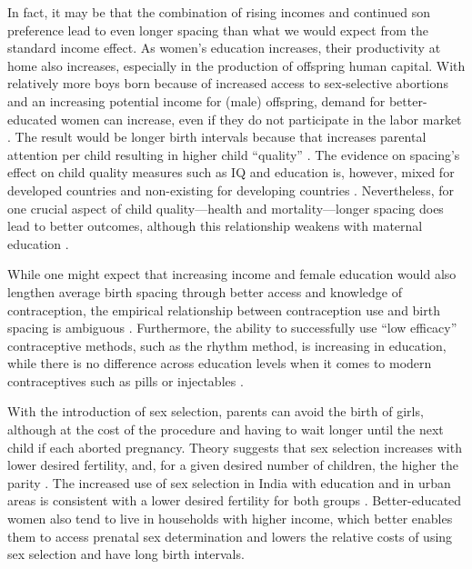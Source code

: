 \documentclass[12pt,letterpaper]{article}
\begin{document}
In fact, it may be that the combination of rising incomes and continued son preference 
lead to even longer spacing than what we would expect from the standard income effect.
As women's education increases, their productivity at home also increases, especially in 
the production of offspring human capital.
With relatively more boys born because of increased access to sex-selective 
abortions and an increasing potential income for (male) offspring, demand for 
better-educated women can increase, even if they do not participate in the labor market 
\citep{Behrman1999}.
The result would be longer birth intervals because that increases parental attention 
per child resulting in higher child ``quality'' \citep{Zajonc1975,Zajonc1976,Razin1980}.
The evidence on spacing's effect on child quality measures such as IQ 
and education is, however, mixed for developed countries and non-existing 
for developing countries
\citep{Powell1993,Pettersson-Lidbom2009,Buckles2012,Barclay2017}.
Nevertheless, for one crucial aspect of child quality---health and mortality---longer 
spacing does lead to better outcomes, although this relationship weakens with maternal 
education \citep{Whitworth2002,Conde-Agudelo2012,Molitoris2019}.


While one might expect that increasing income and female education would also lengthen
average birth spacing through better access and knowledge of contraception, the empirical 
relationship between contraception use and birth spacing is ambiguous 
\citep{Tulasidhar1993,Whitworth2002,Bhalotra2008,Yeakey2009,Kim2010,Soest2018}.
Furthermore, the ability to successfully use ``low efficacy'' contraceptive methods, 
such as the rhythm method, is increasing in education, while there is no difference 
across education levels when it comes to modern contraceptives such as pills or 
injectables \citep{Rosenzweig1989}.

With the introduction of sex selection, parents can avoid the birth of girls, 
although at the cost of the procedure and having to wait longer until the next child 
if each aborted pregnancy.
Theory suggests that sex selection increases with lower desired fertility, and, for a 
given desired number of children, the higher the parity \citep{Portner2015b}.
The increased use of sex selection in India with education and in urban
areas is consistent with a lower desired fertility for both groups
\citep{das_gupta97,retherford03b,Guilmoto2009a,Portner2015b,Jayachandran2017}.
Better-educated women also tend to live in households with higher income, which better 
enables them to access prenatal sex determination and lowers the relative costs of using 
sex selection and have long birth intervals.
\end{document}
